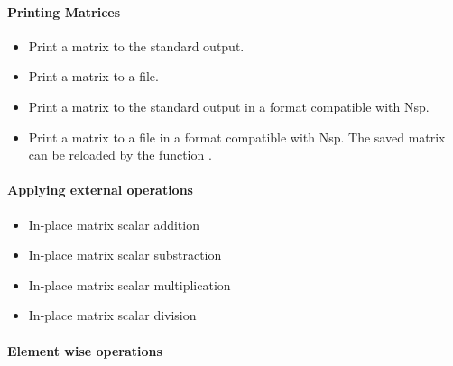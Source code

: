 \paragraph{Printing Matrices}

\begin{itemize}
\item {}
  \sshortdescribe Print a matrix to the standard output.  

\item {}
  \sshortdescribe Print a matrix to a file.

\item {}
  \sshortdescribe Print a matrix to the standard output in a format
  compatible with Nsp.  

\item {}
  \sshortdescribe Print a matrix to a file in a format compatible with Nsp. The
  saved matrix can be reloaded by the function
  .
\end{itemize}

\paragraph{Applying external operations}
\begin{itemize}
\item {}
  \sshortdescribe In-place matrix scalar addition  

\item {}
  \sshortdescribe In-place matrix scalar substraction  

\item {}
  \sshortdescribe In-place matrix scalar multiplication  

\item {}
  \sshortdescribe In-place matrix scalar division  

\end{itemize}

\paragraph{Element wise operations}

